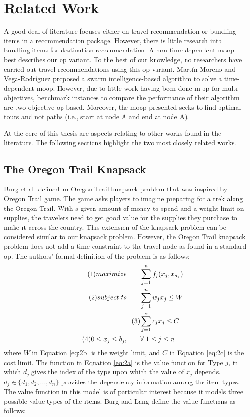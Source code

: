 \section{Related Work}
A good deal of literature focuses either on travel recommendation or bundling items in a recommendation package. However, there is little research into bundling items for destination recommendation. A non-time-dependent \gls{moop} best describes our \gls{op} variant. To the best of our knowledge, no researchers have carried out travel recommendations using this \gls{op} variant. Martín-Moreno and Vega-Rodríguez \parencite{Martin-Moreno2018Multi-ObjectiveProblem} proposed a swarm intelligence-based algorithm to solve a time-dependent \gls{moop}. However, due to little work having been done in \gls{op} for multi-objectives, benchmark instances to compare the performance of their algorithm are two-objective \gls{op} based. Moreover, the \gls{moop} presented seeks to find optimal tours and not paths (i.e., start at node A and end at node A).

At the core of this thesis are aspects relating to other works found in the literature. The following sections highlight the two most closely related works.


\subsection{The Oregon Trail Knapsack} \label{sec:oregon}
Burg et al. \parencite{Oregon_Trail_Knapsack} defined an Oregon Trail knapsack problem that was inspired by Oregon Trail game. The game asks players to imagine preparing for a trek along the Oregon Trail. With a given amount of money to spend and a weight limit on supplies, the travelers need to get good value for the supplies they purchase to make it across the country. This extension of the knapsack problem can be considered similar to our knapsack problem. However, the Oregon Trail knapsack problem does not add a time constraint to the travel node as found in a standard \gls{op}. The authors’ formal definition of the problem is as follows:
\begin{align}\tag{1}
    maximize \qquad &\sum_{j=1}^n f_j(x_j, x_{d_j})\label{eq:2a}\\
    \tag{2}subject \hspace{0.1cm} to \qquad &\sum_{j=1}^n w_j x_j \leq W\label{eq:2b} \\
  \tag{3} &\sum_{j=1}^n c_j x_j \leq C\label{eq:2c} \\
   \tag{4}  0\leq x_j \leq b_j, \qquad &\forall \hspace{0.1cm} 1 \leq j \leq n\label{eq:2d}
\end{align}
where $W$ in Equation \ref{eq:2b} is the weight limit, and $C$ in Equation \ref{eq:2c} is the cost limit. The function in Equation \ref{eq:2a} is the value function for Type $j$, in which $d_j$ gives the index of the type upon which the value of $x_j$ depends.  $d_j \in \{d_1, d_2,...,d_n\}$ provides the dependency information among the item types. The value function in this model is of particular interest because it models three possible value types of the items. Burg and Lang\parencite{Oregon_Trail_Knapsack} define the value functions as follows:

